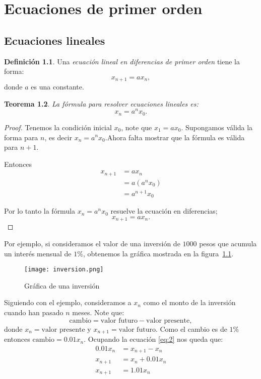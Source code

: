 \documentclass{report}
\newtheorem{teorema}{Teorema}[chapter]
\theoremstyle{definition}
\newtheorem{definicion}[teorema]{Definición}
\begin{document}
\chapter{Ecuaciones de primer orden}

\section{Ecuaciones lineales}

\begin{definicion}
Una \emph{ecuación lineal en diferencias de primer orden} tiene la forma:
\begin{equation}
  \label{lineal}
  x_{n+1}=ax_n,
\end{equation}
donde $a$ es una constante.
\end{definicion}
\begin{teorema}
La fórmula para resolver ecuaciones lineales es:
\begin{equation}
  \label{rum}
  x_n=a^nx_0.
\end{equation}
\end{teorema}

\begin{proof}
Tenemos la condición inicial $x_0$, note que $x_1=ax_0$.  Supongamos
válida la forma para $n$, es decir $x_n=a^nx_0$.Ahora falta mostrar que
la fórmula es válida para $n+1$.

Entonces
\begin{align*}
  x_{n+1}&=ax_n\\
        &=a(a^nx_0)\\
       &=a^{n+1}x_0
\end{align*}

Por lo tanto la fórmula $x_n=a^nx_0$ resuelve la ecuación en
diferencias; $$x_{n+1}=ax_n.$$
\end{proof}

Por ejemplo, si consideramos el valor de una inversión de $1000$ pesos
que acumula un interés mensual de $1\%$, obtenemos la gráfica mostrada
en la figura~\ref{inversion}.

\begin{figure}
  \centering
  \texttt{[image: inversion.png]}
  \caption{Gráfica de una inversión}
  \label{inversion}
\end{figure}

Siguiendo con el ejemplo, consideramos a $x_n$ como el monto
de la inversión cuando han pasado $n$ meses.  Note que:
\begin{equation}
  \label{eq:2}
  \text{cambio}=\text{valor futuro}-\text{valor presente},
\end{equation}
donde $x_n=\text{valor presente}$ y $x_{n+1}=\text{valor futuro}$.
Como el cambio es de $1\%$ entonces $\text{cambio}=0.01x_n$.  Ocupando la ecuación
\eqref{eq:2} nos queda que:
\begin{align*}
  0.01x_n&=x_{n+1}-x_n\\
  x_{n+1}&=x_n+0.01x_n\\
 x_{n+1}&=1.01x_n
\end{align*}
\end{document}
